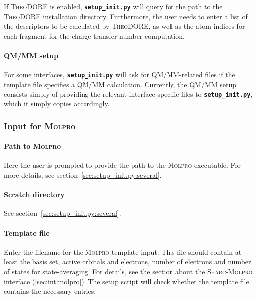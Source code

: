 \documentclass[a4paper,10pt,DIV=15,openany]{scrbook}
\newcommand{\sharc}{\textsc{Sharc}}
\newcommand{\ttt}[1]{\textbf{\texttt{#1}}}
\begin{document}
If \textsc{TheoDORE} is enabled, \ttt{setup\_init.py} will query for the path to the \textsc{TheoDORE} installation directory. Furthermore, the user needs to enter a list of the descriptors to be calculated by \textsc{TheoDORE}, as well as the atom indices for each fragment for the charge transfer number computation.

\paragraph{QM/MM setup}

For some interfaces, \ttt{setup\_init.py} will ask for QM/MM-related files if the template file specifies a QM/MM calculation.
Currently, the QM/MM setup consists simply of providing the relevant interface-specific files to \ttt{setup\_init.py}, which it simply copies accordingly.


\subsubsection{Input for \textsc{Molpro}}\label{sec:setup_init.py:molpro}

\paragraph{Path to \textsc{Molpro}}

Here the user is prompted to provide the path to the \textsc{Molpro} executable. 
For more details, see section~\ref{sec:setup_init.py:several}.

\paragraph{Scratch directory}

See section~\ref{sec:setup_init.py:several}.

\paragraph{Template file}

Enter the filename for the \textsc{Molpro} template input. This file should contain at least the basis set, active orbitals and electrons, number of electrons and number of states for state-averaging. For details, see the section about the \sharc-\textsc{Molpro} interface (\ref{sec:int:molpro}). The setup script will check whether the template file contains the necessary entries. 
\end{document}
